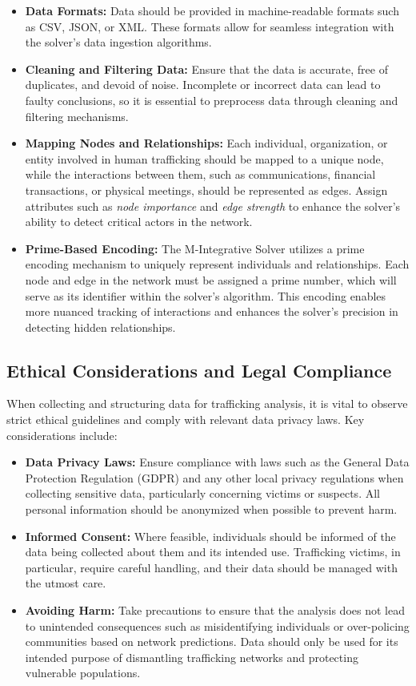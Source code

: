 \documentclass[%
 preprint, linenumbers,
 amsmath,amssymb,
 aps, physrev,
]{revtex4-2}
\begin{document}
\begin{itemize}
    \item \textbf{Data Formats:} Data should be provided in machine-readable formats such as CSV, JSON, or XML. These formats allow for seamless integration with the solver’s data ingestion algorithms.
    \item \textbf{Cleaning and Filtering Data:} Ensure that the data is accurate, free of duplicates, and devoid of noise. Incomplete or incorrect data can lead to faulty conclusions, so it is essential to preprocess data through cleaning and filtering mechanisms.
    \item \textbf{Mapping Nodes and Relationships:} 
    Each individual, organization, or entity involved in human trafficking should be mapped to a unique node, while the interactions between them, such as communications, financial transactions, or physical meetings, should be represented as edges. Assign attributes such as \textit{node importance} and \textit{edge strength} to enhance the solver’s ability to detect critical actors in the network.
    \item \textbf{Prime-Based Encoding:} The M-Integrative Solver utilizes a prime encoding mechanism to uniquely represent individuals and relationships. Each node and edge in the network must be assigned a prime number, which will serve as its identifier within the solver’s algorithm. This encoding enables more nuanced tracking of interactions and enhances the solver’s precision in detecting hidden relationships.
\end{itemize}

\subsection{Ethical Considerations and Legal Compliance}

When collecting and structuring data for trafficking analysis, it is vital to observe strict ethical guidelines and comply with relevant data privacy laws. Key considerations include:

\begin{itemize}
    \item \textbf{Data Privacy Laws:} Ensure compliance with laws such as the General Data Protection Regulation (GDPR) and any other local privacy regulations when collecting sensitive data, particularly concerning victims or suspects. All personal information should be anonymized when possible to prevent harm.
    \item \textbf{Informed Consent:} Where feasible, individuals should be informed of the data being collected about them and its intended use. Trafficking victims, in particular, require careful handling, and their data should be managed with the utmost care.
    \item \textbf{Avoiding Harm:} Take precautions to ensure that the analysis does not lead to unintended consequences such as misidentifying individuals or over-policing communities based on network predictions. Data should only be used for its intended purpose of dismantling trafficking networks and protecting vulnerable populations.
\end{itemize}
\end{document}
